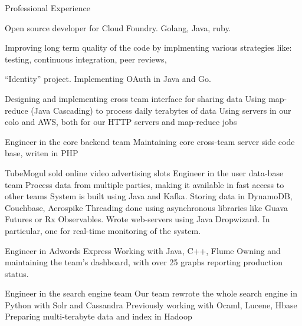 \begin{rubric}{\color{ForestGreen} Professional Experience}

   Open source developer
  for Cloud Foundry. Golang, Java, ruby.

  Improving long term quality of the code by implmenting various
  strategies like: testing, continuous integration, peer reviews,


  \entry*``Identity'' project. Implementing OAuth in Java and Go.

   Designing and implementing cross team interface for sharing data
  Using map-reduce (Java Cascading) to process daily terabytes of data
  Using servers in our colo and AWS, both for our HTTP servers and
  map-reduce jobs

   Engineer in the core backend team
  Maintaining core cross-team server side code base, writen in PHP

   TubeMogul sold online video advertising slots
   Engineer in the user data-base team
   Process data from multiple parties, making it
  available in fast access to other teams
   System is built using Java and Kafka. Storing data in DynamoDB, Couchbase,
  Aerospike
  \entry* Threading done using asynchronous libraries like Guava Futures or Rx Observables.
  \entry* Wrote web-servers using Java Dropwizard. In particular, one for real-time monitoring of the system.

  Engineer in {Adwords Express}
    Working with Java, C++, Flume
  Owning and maintaining the team's dashboard, with over 25 graphs
  reporting production status.

  Engineer in the {search engine team}
  Our team rewrote the whole search engine in Python with Solr and Cassandra
  Previously working with Ocaml, Lucene, Hbase
  Preparing multi-terabyte data and index in Hadoop


\end{rubric}
